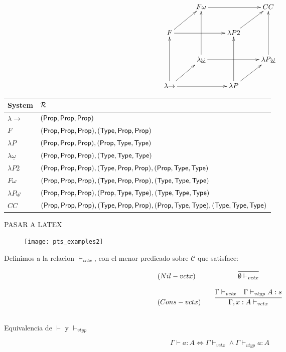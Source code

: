 \[
\xymatrix{
 & F\omega \ar[rr] & & CC
\\
 F \ar[ur]\ar[rr]  & & \lambda P2 \ar[ur]
\\
 & \lambda\underline\omega \ar[uu] \ar[rr] & & \lambda P\underline\omega \ar[uu]
\\
 \lambda{\to} \ar[uu]\ar[rr]\ar[ur] & & \lambda P \ar[ur] \ar[uu]
}
\]
\begin{tabular}{|l|l|}
\hline
System       & $\mathcal{R}$ \\ \hline
$\lambda{\to}$ & $(\mathsf{Prop}, \mathsf{Prop}, \mathsf{Prop})$ \\
$F$            & $(\mathsf{Prop}, \mathsf{Prop}, \mathsf{Prop}), (\mathsf{Type}, \mathsf{Prop}, \mathsf{Prop})$ \\
$\lambda P$    & $(\mathsf{Prop}, \mathsf{Prop}, \mathsf{Prop}), (\mathsf{Prop}, \mathsf{Type}, \mathsf{Type})$ \\
$\lambda\underline\omega$ & $(\mathsf{Prop}, \mathsf{Prop}, \mathsf{Prop}), (\mathsf{Type}, \mathsf{Type}, \mathsf{Type})$ \\
$\lambda P2$    & $(\mathsf{Prop}, \mathsf{Prop}, \mathsf{Prop}), (\mathsf{Type}, \mathsf{Prop}, \mathsf{Prop}), (\mathsf{Prop}, \mathsf{Type}, \mathsf{Type})$ \\
$F\omega$      & $(\mathsf{Prop}, \mathsf{Prop}, \mathsf{Prop}), (\mathsf{Type}, \mathsf{Prop}, \mathsf{Prop}), (\mathsf{Type}, \mathsf{Type}, \mathsf{Type})$ \\
$\lambda P\underline\omega$ & $(\mathsf{Prop}, \mathsf{Prop}, \mathsf{Prop}), (\mathsf{Prop}, \mathsf{Type}, \mathsf{Type}), (\mathsf{Type}, \mathsf{Type}, \mathsf{Type})$ \\ 
$CC$           & $(\mathsf{Prop}, \mathsf{Prop}, \mathsf{Prop}), (\mathsf{Type}, \mathsf{Prop}, \mathsf{Prop}), (\mathsf{Prop}, \mathsf{Type}, \mathsf{Type}), (\mathsf{Type}, \mathsf{Type}, \mathsf{Type})$ \\ \hline
\end{tabular}

PASAR A LATEX
\begin{figure}[h]
\centering
\texttt{[image: pts\_examples2]}
\end{figure}

\begin{definition}
Definimos a la relacion $\vdash_{vctx}$, con el menor predicado sobre $\mathcal{C}$ que satisface:

\[
\begin{array}{llcr}
	(Nil-vctx)  & &\infer{\emptyset \vdash_{vctx}}{} \\ \\ 
	(Cons-vctx) & &\infer{\Gamma, x:A \vdash_{vctx}}{\Gamma \vdash_{vctx} & \Gamma \vdash_{vtyp} A : s} \\ \\ 
	

	
\end{array}
\]

\begin{lemma}{Equivalencia de $\vdash$ y $\vdash_{vtyp}$}

\begin{equation}
\Gamma \vdash a : A \Leftrightarrow \Gamma \vdash_{vctx} \land \Gamma \vdash_{vtyp} a:A
\end{equation}
\end{lemma}

\end{definition}


